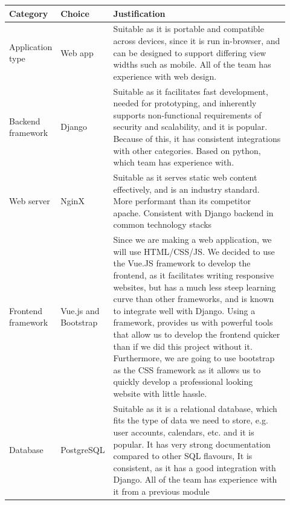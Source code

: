 \documentclass[10pt]{article}
\begin{document}
\begin{longtable}{|p{0.085\linewidth}|p{0.09\linewidth}|p{0.75\linewidth}|}
    \hline \textbf{Category} & \textbf{Choice} & \textbf{Justification} \\ \hline\hline


    Application type
    &
    Web app
    &
    Suitable as it is portable and compatible
    across devices, since it is run in-browser, and can be designed to support
    differing view widths such as mobile. All of the team has experience with
    web design.
    \\ \hline

    Backend framework
    &
    Django
    &
    Suitable as it facilitates fast development, needed for prototyping, and
    inherently supports non-functional requirements of security and scalability,
    and it is popular. Because of this, it has consistent integrations with
    other categories. Based on python, which team has experience with.
    \\ \hline

    Web server
    &
    NginX
    &
    Suitable as it serves static web content effectively, and is an industry
    standard. More performant than its competitor apache. Consistent with Django
    backend in common technology stacks
    \\ \hline

    Frontend framework
    &
    Vue.js and Bootstrap
    &
    Since we are making a web application, we will use HTML/CSS/JS. We decided
    to use the Vue.JS framework to develop the frontend, as it facilitates
    writing responsive websites, but has a much less steep learning curve than
    other frameworks, and is known to integrate well with Django. Using a
    framework, provides us with powerful tools that allow us to develop the
    frontend quicker than if we did this project without it. Furthermore, we are
    going to use bootstrap as the CSS framework as it allows us to quickly
    develop a professional looking website with little hassle.
    \\ \hline

    Database
    &
    PostgreSQL
    &
    Suitable as it is a relational database, which fits the type of data we need
    to store, e.g. user accounts, calendars, etc. and it is popular. It has very
    strong documentation compared to other SQL flavours, It is consistent, as it
    has a good integration with Django. All of the team has experience with it
    from a previous module
    \\ \hline


\end{longtable}
\end{document}
